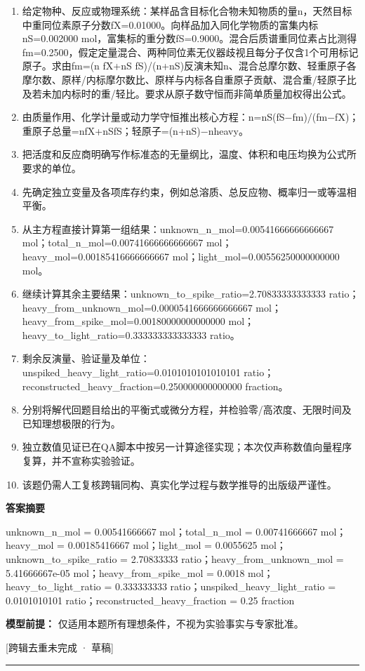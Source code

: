 \documentclass[UTF8,11pt,a4paper]{ctexart}
\begin{document}
\begin{enumerate}
\item 给定物种、反应或物理系统：某样品含目标化合物未知物质的量n，天然目标中重同位素原子分数fX=0.01000。向样品加入同化学物质的富集内标nS=0.002000 mol，富集标的重分数fS=0.9000。混合后质谱重同位素占比测得fm=0.2500，假定定量混合、两种同位素无仪器歧视且每分子仅含1个可用标记原子。求由fm=(n fX+nS fS)/(n+nS)反演未知n、混合总摩尔数、轻重原子各摩尔数、原样/内标摩尔数比、原样与内标各自重原子贡献、混合重/轻原子比及若未加内标时的重/轻比。要求从原子数守恒而非简单质量加权得出公式。
\item 由质量作用、化学计量或动力学守恒推出核心方程：n=nS(fS−fm)/(fm−fX)；重原子总量=nfX+nSfS；轻原子=(n+nS)−nheavy。
\item 把活度和反应商明确写作标准态的无量纲比，温度、体积和电压均换为公式所要求的单位。
\item 先确定独立变量及各项库存约束，例如总溶质、总反应物、概率归一或等温相平衡。
\item 从主方程直接计算第一组结果：unknown\_n\_mol=0.00541666666666667 mol；total\_n\_mol=0.00741666666666667 mol；heavy\_mol=0.00185416666666667 mol；light\_mol=0.00556250000000000 mol。
\item 继续计算其余主要结果：unknown\_to\_spike\_ratio=2.70833333333333 ratio；heavy\_from\_unknown\_mol=0.0000541666666666667 mol；heavy\_from\_spike\_mol=0.00180000000000000 mol；heavy\_to\_light\_ratio=0.333333333333333 ratio。
\item 剩余反演量、验证量及单位：unspiked\_heavy\_light\_ratio=0.0101010101010101 ratio；reconstructed\_heavy\_fraction=0.250000000000000 fraction。
\item 分别将解代回题目给出的平衡式或微分方程，并检验零/高浓度、无限时间及已知理想极限的行为。
\item 独立数值见证已在QA脚本中按另一计算途径实现；本次仅声称数值向量程序复算，并不宣称实验验证。
\item 该题仍需人工复核跨辑同构、真实化学过程与数学推导的出版级严谨性。
\end{enumerate}
\noindent\textbf{答案摘要}\par
unknown\_n\_mol = 0.00541666667 mol；total\_n\_mol = 0.00741666667 mol；heavy\_mol = 0.00185416667 mol；light\_mol = 0.0055625 mol；unknown\_to\_spike\_ratio = 2.70833333 ratio；heavy\_from\_unknown\_mol = 5.41666667e-05 mol；heavy\_from\_spike\_mol = 0.0018 mol；heavy\_to\_light\_ratio = 0.333333333 ratio；unspiked\_heavy\_light\_ratio = 0.0101010101 ratio；reconstructed\_heavy\_fraction = 0.25 fraction\par
\noindent\textbf{模型前提：}
仅适用本题所有理想条件，不视为实验事实与专家批准。\par
\noindent\textcolor{red!65!black}{[跨辑去重未完成 · 草稿]} \par
\medskip\hrule\medskip
\end{document}
